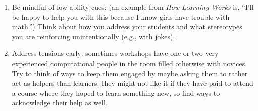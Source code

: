 \begin{enumerate}
\item
  Be mindful of low-ability cues: (an example from \emph{How Learning
  Works} is, ``I'll be happy to help you with this because I know girls
  have trouble with math.'') Think about how you address your students
  and what stereotypes you are reinforcing unintentionally (e.g., with
  jokes).
\item
  Address tensions early: sometimes workshops have one or two very
  experienced computational people in the room filled otherwise with
  novices. Try to think of ways to keep them engaged by maybe asking
  them to rather act as helpers than learners: they might not like it if
  they have paid to attend a course where they hoped to learn something
  new, so find ways to acknowledge their help as well.
\end{enumerate}


